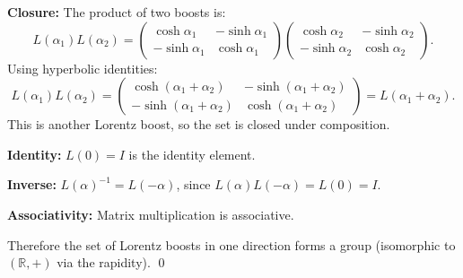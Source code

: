 \documentclass[12pt]{article}
\begin{document}
\textbf{Closure:} The product of two boosts is:
\[
L(\alpha_1)L(\alpha_2) = \begin{pmatrix} \cosh\alpha_1 & -\sinh\alpha_1 \\ -\sinh\alpha_1 & \cosh\alpha_1 \end{pmatrix}\begin{pmatrix} \cosh\alpha_2 & -\sinh\alpha_2 \\ -\sinh\alpha_2 & \cosh\alpha_2 \end{pmatrix}.
\]
Using hyperbolic identities:
\[
L(\alpha_1)L(\alpha_2) = \begin{pmatrix} \cosh(\alpha_1+\alpha_2) & -\sinh(\alpha_1+\alpha_2) \\ -\sinh(\alpha_1+\alpha_2) & \cosh(\alpha_1+\alpha_2) \end{pmatrix} = L(\alpha_1 + \alpha_2).
\]
This is another Lorentz boost, so the set is closed under composition.

\textbf{Identity:} $L(0) = I$ is the identity element.

\textbf{Inverse:} $L(\alpha)^{-1} = L(-\alpha)$, since $L(\alpha)L(-\alpha) = L(0) = I$.

\textbf{Associativity:} Matrix multiplication is associative.

Therefore the set of Lorentz boosts in one direction forms a group (isomorphic to $(\mathbb{R}, +)$ via the rapidity). \qed
\end{document}
